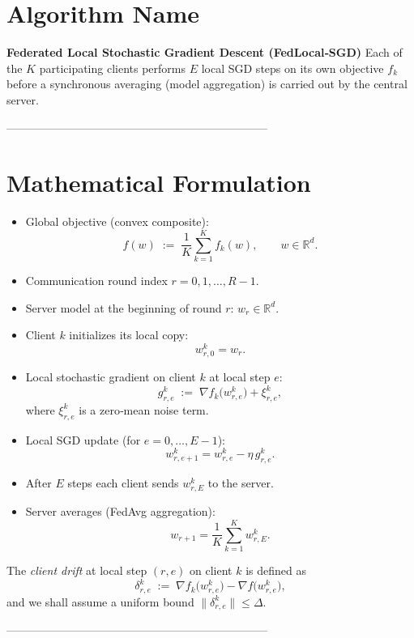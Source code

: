 \documentclass{article}
\newcommand{\RR}{\mathbb{R}}
\newcommand{\grad}{\nabla}
\begin{document}
\section*{Algorithm Name}
\textbf{Federated Local Stochastic Gradient Descent (FedLocal‑SGD)}  
Each of the $K$ participating clients performs $E$ local SGD steps on its own
objective $f_k$ before a synchronous averaging (model aggregation) is carried out
by the central server.

---------------------------------------------------------------------

\section*{Mathematical Formulation}
\begin{itemize}
    \item Global objective (convex composite):
    \[
        f(w)\;:=\;\frac1K\sum_{k=1}^{K}f_k(w),\qquad w\in\RR^d .
    \]
    \item Communication round index $r=0,1,\dots,R-1$.
    \item Server model at the beginning of round $r$: $w_r\in\RR^d$.
    \item Client $k$ initializes its local copy:
    \[
        w_{r,0}^{k}=w_r .
    \]
    \item Local stochastic gradient on client $k$ at local step $e$:
    \[
        g_{r,e}^{k}\;:=\;\grad f_k\!\bigl(w_{r,e}^{k}\bigr)+\xi_{r,e}^{k},
    \]
    where $\xi_{r,e}^{k}$ is a zero‑mean noise term.
    \item Local SGD update (for $e=0,\dots,E-1$):
    \[
        w_{r,e+1}^{k}=w_{r,e}^{k}-\eta\, g_{r,e}^{k}. \tag{1}
    \]
    \item After $E$ steps each client sends $w_{r,E}^{k}$ to the server.
    \item Server averages (FedAvg aggregation):
    \[
        w_{r+1}= \frac1K\sum_{k=1}^{K} w_{r,E}^{k}. \tag{2}
    \]
\end{itemize}
The \emph{client drift} at local step $(r,e)$ on client $k$ is defined as
\[
    \delta_{r,e}^{k}\;:=\;\grad f_k\!\bigl(w_{r,e}^{k}\bigr)-\grad f\!\bigl(w_{r,e}^{k}\bigr),
\]
and we shall assume a uniform bound $\|\delta_{r,e}^{k}\|\le \Delta$.

---------------------------------------------------------------------
\end{document}
